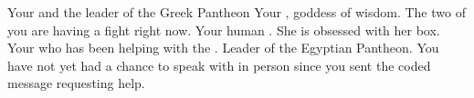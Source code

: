 \documentclass[char]{guardians}
\begin{document}
\begin{contacts}
  \contact{\cZeus{}} Your \cZeus{\spouse} and the leader of the Greek Pantheon
  \contact{\cAthena{}} Your \cAthena{\offspring}, goddess of wisdom. The two of you are having a fight right now.
  \contact{\cPandora{}} Your human \cPandora{\offspring}. She is obsessed with her box.
  \contact{\cHephaestus{}} Your \cHephaestus{\offspring} who has been helping \cZeus{} with the \stone{}.
  \contact{\cOsiris{}} Leader of the Egyptian Pantheon. You have not yet had a chance to speak with \cOsiris{\them} in person since you sent \cOsiris{\them} the coded message requesting \cOsiris{\their} help.
\end{contacts}
\end{document}
